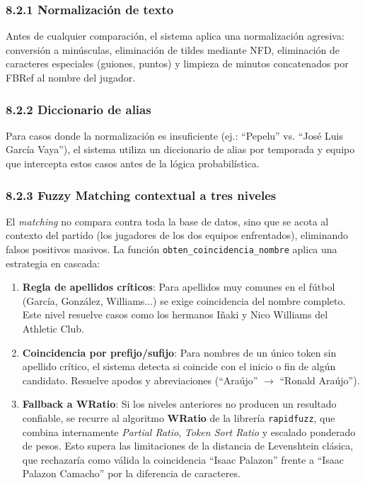 \subsubsection{8.2.1 Normalización de texto}
 
Antes de cualquier comparación, el sistema aplica una normalización agresiva:
conversión a minúsculas, eliminación de tildes mediante NFD, eliminación de caracteres
especiales (guiones, puntos) y limpieza de minutos concatenados por FBRef al nombre
del jugador.
 
\subsubsection{8.2.2 Diccionario de alias}
 
Para casos donde la normalización es insuficiente (ej.: ``Pepelu'' vs. ``José Luis García
Vaya''), el sistema utiliza un diccionario de alias por temporada y equipo que intercepta
estos casos antes de la lógica probabilística.
 
\subsubsection{8.2.3 Fuzzy Matching contextual a tres niveles}
 
El \textit{matching} no compara contra toda la base de datos, sino que se acota al
contexto del partido (los jugadores de los dos equipos enfrentados), eliminando falsos
positivos masivos. La función \texttt{obten\_coincidencia\_nombre} aplica una estrategia
en cascada:
 
\begin{enumerate}
    \item \textbf{Regla de apellidos críticos}: Para apellidos muy comunes en el fútbol
    (García, González, Williams...) se exige coincidencia del nombre completo. Este nivel
    resuelve casos como los hermanos Iñaki y Nico Williams del Athletic Club.
 
    \item \textbf{Coincidencia por prefijo/sufijo}: Para nombres de un único token sin
    apellido crítico, el sistema detecta si coincide con el inicio o fin de algún candidato.
    Resuelve apodos y abreviaciones (``Araújo'' $\rightarrow$ ``Ronald Araújo'').
 
    \item \textbf{Fallback a WRatio}: Si los niveles anteriores no producen un resultado
    confiable, se recurre al algoritmo \textbf{WRatio} de la librería \texttt{rapidfuzz},
    que combina internamente \textit{Partial Ratio}, \textit{Token Sort Ratio} y escalado
    ponderado de pesos. Esto supera las limitaciones de la distancia de Levenshtein clásica,
    que rechazaría como válida la coincidencia ``Isaac Palazon'' frente a ``Isaac Palazon
    Camacho'' por la diferencia de caracteres.
\end{enumerate}
 
